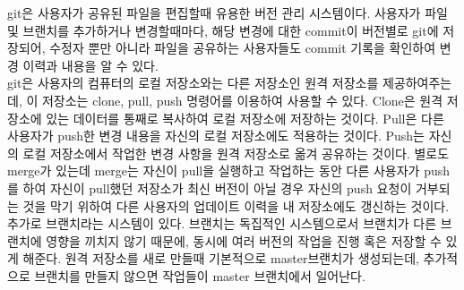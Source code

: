 \documentclass{article}
\begin{document}
git은 사용자가 공유된 파일을 편집할때 유용한 버전 관리 시스템이다. 사용자가 파일 및 브랜치를 추가하거나 변경할때마다, 해당 변경에 대한 commit이 버전별로 git에 저장되어, 수정자 뿐만 아니라 파일을 공유하는 사용자들도 commit 기록을 확인하여 변경 이력과 내용을 알 수 있다.  
\\git은 사용자의 컴퓨터의 로컬 저장소와는 다른 저장소인 원격 저장소를 제공하여주는데, 이 저장소는 clone, pull, push 명령어를 이용하여 사용할 수 있다. Clone은 원격 저장소에 있는 데이터를 통째로 복사하여 로컬 저장소에 저장하는 것이다. Pull은 다른 사용자가 push한 변경 내용을 자신의 로컬 저장소에도 적용하는 것이다. Push는 자신의 로컬 저장소에서 작업한 변경 사항을 원격 저장소로 옮겨 공유하는 것이다. 별로도 merge가 있는데 merge는 자신이 pull을 실행하고 작업하는 동안 다른 사용자가 push를 하여 자신이 pull했던 저장소가 최신 버전이 아닐 경우 자신의 push 요청이 거부되는 것을 막기 위하여 다른 사용자의 업데이트 이력을 내 저장소에도 갱신하는 것이다.  
\\추가로 브랜치라는 시스템이 있다. 브랜치는 독집적인 시스템으로서 브랜치가 다른 브랜치에 영향을 끼치지 않기 때문에, 동시에 여러 버전의 작업을 진행 혹은 저장할 수 있게 해준다. 원격 저장소를 새로 만들때 기본적으로 master브랜치가 생성되는데, 추가적으로 브랜치를 만들지 않으면 작업들이 master 브랜치에서 일어난다.
\end{document}
